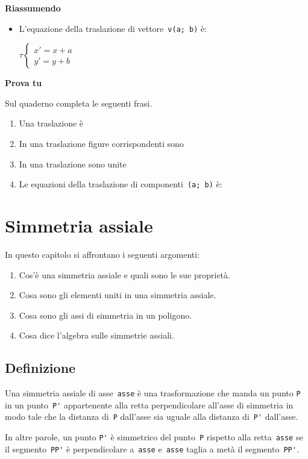 \textbf{Riassumendo}
\begin{itemize}
\item L'equazione della traslazione di vettore~\lstinline{v(a; b)} è:

\(\tau \left \{
\begin{array}{l} x' = x + a \\ y' = y + b \end{array} \right .\)

\end{itemize}

\textbf{Prova tu}

Sul quaderno completa le seguenti frasi.
\begin{enumerate} [noitemsep]
\item Una traslazione è
\item In una traslazione figure corrispondenti sono
\item In una traslazione sono unite
\item Le equazioni della traslazione di componenti~\lstinline{(a; b)} è:
\end{enumerate}


\section{Simmetria assiale}
\label{sec:simmetria-assiale}
In questo capitolo si affrontano i seguenti argomenti:
\begin{enumerate} [noitemsep]
\item Cos'è una simmetria assiale e quali sono le sue proprietà.
\item Cosa sono gli elementi uniti in una simmetria assiale.
\item Cosa sono gli assi di simmetria in un poligono.
\item Cosa dice l'algebra sulle simmetrie assiali.
\end{enumerate}


\subsection{Definizione}

Una simmetria assiale di asse~\lstinline{asse} è una trasformazione che manda 
un punto
\lstinline{P} in un punto~\lstinline{P'} appartenente alla retta perpendicolare 
all'asse di
simmetria in modo tale che la distanza di~\lstinline{P} dall'asse
sia uguale alla distanza di~\lstinline{P'} dall'asse.

In altre parole,
un punto \lstinline{P'} è simmetrico del punto~\lstinline{P} rispetto alla 
retta~\lstinline{asse} 
se il
segmento~\lstinline{PP'} è perpendicolare a~\lstinline{asse} e~\lstinline{asse} 
taglia a metà il segmento~\lstinline{PP'}.

